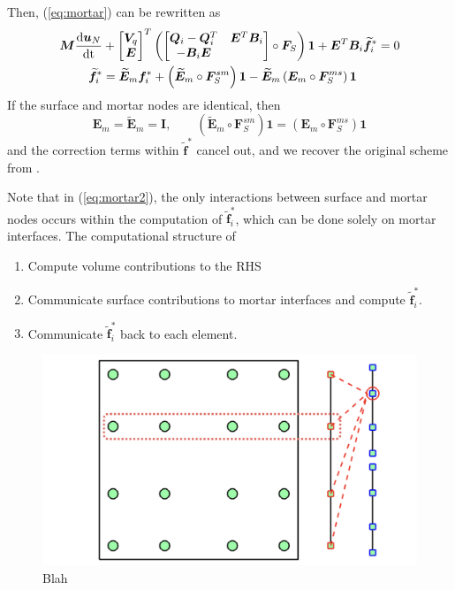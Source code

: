 \documentclass{svjour3}                     %
\renewcommand{\tilde}{\widetilde}
\newcommand{\td}[2]{\frac{{\rm d}#1}{{\rm d}{\rm #2}}}
\newcommand{\LRp}[1]{\left( #1 \right)}
\begin{document}
Then, (\ref{eq:mortar}) can be rewritten as 
\begin{align}
\bm{M}\td{\bm{u}_N}{t} &+ 
\begin{bmatrix} \bm{V}_q \\ \bm{E} \end{bmatrix}^T
\LRp{\begin{bmatrix}
\bm{Q}_i-\bm{Q}_i^T & \bm{E}^T\bm{B}_i\\
-\bm{B}_i\bm{E} & \\
\end{bmatrix} \circ \bm{F}_S}\bm{1} + \bm{E}^T\bm{B}_i \tilde{\bm{f}}^*_i = 0 \label{eq:mortar2}\\
\tilde{\bm{f}}^*_i &= \tilde{\bm{E}}_m\bm{f}^*_i + \LRp{\tilde{\bm{E}}_m\circ \bm{F}_S^{sm}}\bm{1} - \tilde{\bm{E}}_m \LRp{ \bm{E}_m \circ \bm{F}_S^{ms}}\bm{1} 
\nonumber
\end{align}
If the surface and mortar nodes are identical, then 
\[
\bm{E}_m = \tilde{\bm{E}}_m = \bm{I}, \qquad \LRp{\tilde{\bm{E}}_m \circ \bm{F}_S^{sm}}\bm{1} = \LRp{ \bm{E}_m \circ \bm{F}_S^{ms}}\bm{1}
\]
and the correction terms within $\tilde{\bm{f}}^*$ cancel out, and we recover the original scheme from \cite{chan2017discretely}.

Note that in (\ref{eq:mortar2}), the only interactions between surface and mortar nodes occurs within the computation of $\tilde{\bm{f}}^*_i$, which can be done solely on mortar interfaces.  The computational structure of 
\begin{enumerate}
\item Compute volume contributions to the RHS
\item Communicate surface contributions to mortar interfaces and compute $\tilde{\bm{f}}^*_i$.
\item Communicate $\tilde{\bm{f}}^*_i$ back to each element.  
\end{enumerate}

\begin{figure}
\centering
\includegraphics[width=.55\textwidth]{mortar_coupling.png}
\caption{Blah}
\end{figure}
\end{document}
